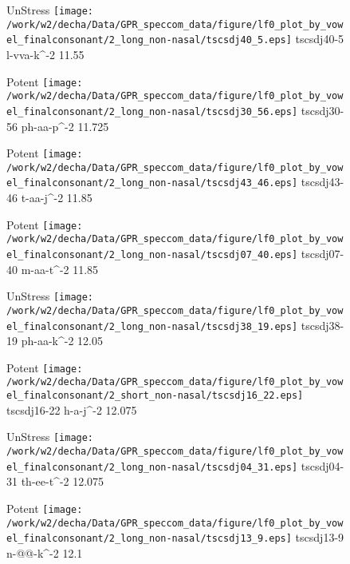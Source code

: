 \documentclass{article}
\begin{document}
\begin{figure}[t]
\begin{minipage}[b]{.24\textwidth}
UnStress
\centering
\texttt{[image: /work/w2/decha/Data/GPR\_speccom\_data/figure/lf0\_plot\_by\_vowel\_finalconsonant/2\_long\_non-nasal/tscsdj40\_5.eps]}
tscsdj40-5 l-vva-k\textasciicircum-2 11.55
\end{minipage}
\begin{minipage}[b]{.24\textwidth}
\colorbox{Apricot}{Potent}
\centering
\texttt{[image: /work/w2/decha/Data/GPR\_speccom\_data/figure/lf0\_plot\_by\_vowel\_finalconsonant/2\_long\_non-nasal/tscsdj30\_56.eps]}
tscsdj30-56 ph-aa-p\textasciicircum-2 11.725
\end{minipage}
\begin{minipage}[b]{.24\textwidth}
\colorbox{Apricot}{Potent}
\centering
\texttt{[image: /work/w2/decha/Data/GPR\_speccom\_data/figure/lf0\_plot\_by\_vowel\_finalconsonant/2\_long\_non-nasal/tscsdj43\_46.eps]}
tscsdj43-46 t-aa-j\textasciicircum-2 11.85
\end{minipage}
\begin{minipage}[b]{.24\textwidth}
\colorbox{Apricot}{Potent}
\centering
\texttt{[image: /work/w2/decha/Data/GPR\_speccom\_data/figure/lf0\_plot\_by\_vowel\_finalconsonant/2\_long\_non-nasal/tscsdj07\_40.eps]}
tscsdj07-40 m-aa-t\textasciicircum-2 11.85
\end{minipage}
\end{figure}
\clearpage
\begin{figure}[t]
\begin{minipage}[b]{.24\textwidth}
UnStress
\centering
\texttt{[image: /work/w2/decha/Data/GPR\_speccom\_data/figure/lf0\_plot\_by\_vowel\_finalconsonant/2\_long\_non-nasal/tscsdj38\_19.eps]}
tscsdj38-19 ph-aa-k\textasciicircum-2 12.05
\end{minipage}
\begin{minipage}[b]{.24\textwidth}
\colorbox{Apricot}{Potent}
\centering
\texttt{[image: /work/w2/decha/Data/GPR\_speccom\_data/figure/lf0\_plot\_by\_vowel\_finalconsonant/2\_short\_non-nasal/tscsdj16\_22.eps]}
tscsdj16-22 h-a-j\textasciicircum-2 12.075
\end{minipage}
\begin{minipage}[b]{.24\textwidth}
UnStress
\centering
\texttt{[image: /work/w2/decha/Data/GPR\_speccom\_data/figure/lf0\_plot\_by\_vowel\_finalconsonant/2\_long\_non-nasal/tscsdj04\_31.eps]}
tscsdj04-31 th-ee-t\textasciicircum-2 12.075
\end{minipage}
\begin{minipage}[b]{.24\textwidth}
\colorbox{Apricot}{Potent}
\centering
\texttt{[image: /work/w2/decha/Data/GPR\_speccom\_data/figure/lf0\_plot\_by\_vowel\_finalconsonant/2\_long\_non-nasal/tscsdj13\_9.eps]}
tscsdj13-9 n-@@-k\textasciicircum-2 12.1
\end{minipage}
\end{figure}
\end{document}
